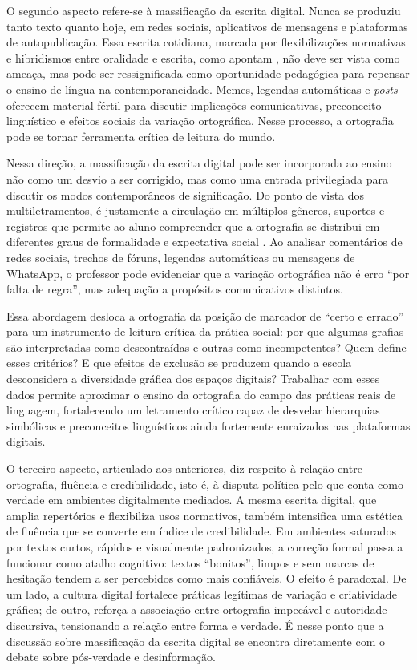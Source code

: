 \documentclass[portuguese]{textolivre}
\begin{document}
O segundo aspecto refere-se à massificação da escrita digital. Nunca se produziu tanto texto quanto hoje, em redes sociais, aplicativos de mensagens e plataformas de autopublicação. Essa escrita cotidiana, marcada por flexibilizações normativas e hibridismos entre oralidade e escrita, como apontam \textcite{barton2013language}, não deve ser vista como ameaça, mas pode ser ressignificada como oportunidade pedagógica para repensar o ensino de língua na contemporaneidade. Memes, legendas automáticas e \textit{posts} oferecem material fértil para discutir implicações comunicativas, preconceito linguístico e efeitos sociais da variação ortográfica. Nesse processo, a ortografia pode se tornar ferramenta crítica de leitura do mundo.

Nessa direção, a massificação da escrita digital pode ser incorporada ao ensino não como um desvio a ser corrigido, mas como uma entrada privilegiada para discutir os modos contemporâneos de significação. Do ponto de vista dos multiletramentos, é justamente a circulação em múltiplos gêneros, suportes e registros que permite ao aluno compreender que a ortografia se distribui em diferentes graus de formalidade e expectativa social \cite{newlondongroup1996multiliteracies,rojo2012multiletramentos}. Ao analisar comentários de redes sociais, trechos de fóruns, legendas automáticas ou mensagens de WhatsApp, o professor pode evidenciar que a variação ortográfica não é erro “por falta de regra”, mas adequação a propósitos comunicativos distintos.

Essa abordagem desloca a ortografia da posição de marcador de “certo e errado” para um instrumento de leitura crítica da prática social: por que algumas grafias são interpretadas como descontraídas e outras como incompetentes? Quem define esses critérios? E que efeitos de exclusão se produzem quando a escola desconsidera a diversidade gráfica dos espaços digitais? Trabalhar com esses dados permite aproximar o ensino da ortografia do campo das práticas reais de linguagem, fortalecendo um letramento crítico capaz de desvelar hierarquias simbólicas e preconceitos linguísticos ainda fortemente enraizados nas plataformas digitais.

O terceiro aspecto, articulado aos anteriores, diz respeito à relação entre ortografia, fluência e credibilidade, isto é, à disputa política pelo que conta como verdade em ambientes digitalmente mediados. A mesma escrita digital, que amplia repertórios e flexibiliza usos normativos, também intensifica uma estética de fluência que se converte em índice de credibilidade. Em ambientes saturados por textos curtos, rápidos e visualmente padronizados, a correção formal passa a funcionar como atalho cognitivo: textos “bonitos”, limpos e sem marcas de hesitação tendem a ser percebidos como mais confiáveis. O efeito é paradoxal. De um lado, a cultura digital fortalece práticas legítimas de variação e criatividade gráfica; de outro, reforça a associação entre ortografia impecável e autoridade discursiva, tensionando a relação entre forma e verdade. É nesse ponto que a discussão sobre massificação da escrita digital se encontra diretamente com o debate sobre pós-verdade e desinformação.
\end{document}
